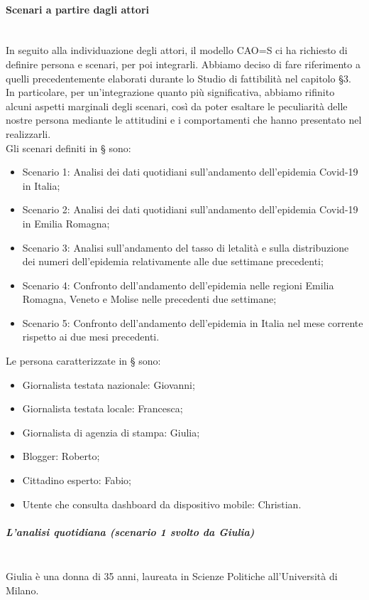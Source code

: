 \noindent
\paragraph{Scenari a partire dagli attori}\mbox{}\\
In seguito alla individuazione degli attori, il modello CAO=S ci ha richiesto di definire persona e scenari, per poi integrarli.
Abbiamo deciso di fare riferimento a quelli precedentemente elaborati durante lo Studio di fattibilità nel capitolo §3.
In particolare, per un'integrazione quanto più significativa, abbiamo rifinito alcuni aspetti marginali degli scenari, così da poter esaltare le peculiarità delle nostre persona mediante le attitudini e i comportamenti che hanno presentato nel realizzarli.\\
Gli scenari definiti in § sono:
\begin{itemize}
    \item Scenario 1: Analisi dei dati quotidiani sull'andamento dell'epidemia Covid-19 in Italia;
    \item Scenario 2: Analisi dei dati quotidiani sull'andamento dell'epidemia Covid-19 in Emilia Romagna;
    \item Scenario 3: Analisi sull'andamento del tasso di letalità e sulla distribuzione dei numeri dell'epidemia relativamente alle due settimane precedenti;
    \item Scenario 4: Confronto dell'andamento dell'epidemia nelle regioni Emilia Romagna, Veneto e Molise nelle precedenti due settimane;
    \item Scenario 5: Confronto dell'andamento dell'epidemia in Italia nel mese corrente rispetto ai due mesi precedenti.
\end{itemize}
Le persona caratterizzate in § sono:
\begin{itemize}
    \item Giornalista testata nazionale: Giovanni;
    \item Giornalista testata locale: Francesca;
    \item Giornalista di agenzia di stampa: Giulia;
    \item Blogger: Roberto;
    \item Cittadino esperto: Fabio;
    \item Utente che consulta dashboard da dispositivo mobile: Christian.
\end{itemize}
\noindent
\subparagraph{L'analisi quotidiana (scenario 1 svolto da Giulia)}\mbox{}\\
Giulia è una donna di 35 anni, laureata in Scienze Politiche all'Università di Milano.
